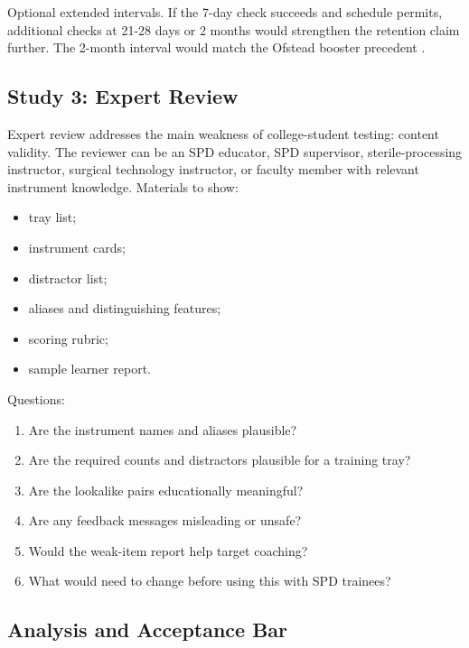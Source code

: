 \documentclass[10pt,a4paper]{article}
\begin{document}
Optional extended intervals. If the 7-day check succeeds and schedule permits,
additional checks at 21-28 days or 2 months would strengthen the retention claim
further. The 2-month interval would match the Ofstead booster precedent
\cite{ofstead-et-al-2023}.
\subsection{Study 3: Expert Review}


Expert review addresses the main weakness of college-student testing: content
validity. The reviewer can be an SPD educator, SPD supervisor,
sterile-processing instructor, surgical technology instructor, or faculty
member with relevant instrument knowledge.
Materials to show:
\begin{itemize}
  \item tray list;
  \item instrument cards;
  \item distractor list;
  \item aliases and distinguishing features;
  \item scoring rubric;
  \item sample learner report.
\end{itemize}
Questions:
\begin{enumerate}
  \item Are the instrument names and aliases plausible?
  \item Are the required counts and distractors plausible for a training tray?
  \item Are the lookalike pairs educationally meaningful?
  \item Are any feedback messages misleading or unsafe?
  \item Would the weak-item report help target coaching?
  \item What would need to change before using this with SPD trainees?
\end{enumerate}
\subsection{Analysis and Acceptance Bar}
\end{document}

